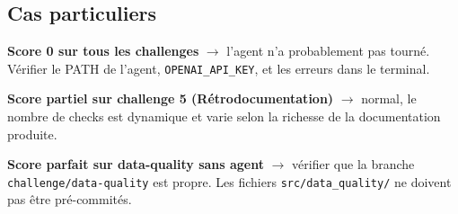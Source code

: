 \documentclass[11pt,a4paper]{article}
\newcommand{\code}[1]{\texttt{#1}}
\begin{document}
\subsection{Cas particuliers}

\textbf{Score 0 sur tous les challenges} $\to$ l'agent n'a probablement pas tourné.
Vérifier le PATH de l'agent, \code{OPENAI\_API\_KEY}, et les erreurs dans le terminal.

\textbf{Score partiel sur challenge 5 (Rétrodocumentation)} $\to$ normal, le nombre de checks est
dynamique et varie selon la richesse de la documentation produite.

\textbf{Score parfait sur data-quality sans agent} $\to$ vérifier que la branche
\code{challenge/data-quality} est propre. Les fichiers \code{src/data\_quality/}
ne doivent pas être pré-commités.
\end{document}
